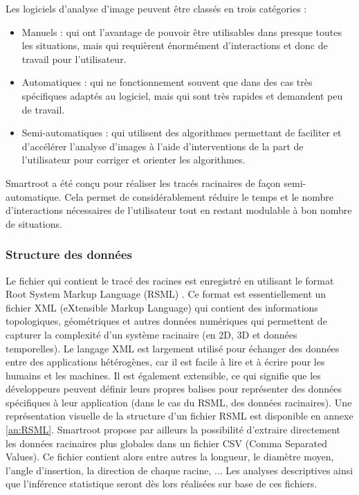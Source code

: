 \noindent Les logiciels d'analyse d'image peuvent être classés en trois catégories :
\begin{itemize}
    \item Manuels : qui ont l'avantage de pouvoir être utilisables dans presque toutes les situations, mais qui requièrent énormément d'interactions et donc de travail pour l'utilisateur.
    \item Automatiques : qui ne fonctionnement souvent que dans des cas très spécifiques adaptés au logiciel, mais qui sont très rapides et demandent peu de travail.
    \item Semi-automatiques : qui utilisent des algorithmes permettant de faciliter et d'accélérer l'analyse d'images à l'aide d'interventions de la part de l'utilisateur pour corriger et orienter les algorithmes.
\end{itemize}
Smartroot a été conçu pour réaliser les tracés racinaires de façon semi-automatique.
Cela permet de considérablement réduire le temps et le nombre d'interactions nécessaires de l'utilisateur tout en restant modulable à bon nombre de situations.

\subsubsection{Structure des données}

Le fichier qui contient le tracé des racines est enregistré en utilisant le format Root System Markup Language (RSML) \citep{lobet_plant_2014}.
Ce format est essentiellement un fichier XML (eXtensible Markup Language) qui contient des informations topologiques, géométriques et autres données numériques qui permettent de capturer la complexité d'un système racinaire (en 2D, 3D et données temporelles).
Le langage XML est largement utilisé pour échanger des données entre des applications hétérogènes, car il est facile à lire et à écrire pour les humains et les machines. 
Il est également extensible, ce qui signifie que les développeurs peuvent définir leurs propres balises pour représenter des données spécifiques à leur application (dans le cas du RSML, des données racinaires).
Une représentation visuelle de la structure d'un fichier RSML est disponible en annexe \ref{an:RSML}.
Smartroot propose par ailleurs la possibilité d'extraire directement les données racinaires plus globales dans un fichier CSV (Comma Separated Values).
Ce fichier contient alors entre autres la longueur, le diamètre moyen, l'angle d'insertion, la direction de chaque racine, ...
Les analyses descriptives ainsi que l'inférence statistique seront dès lors réalisées sur base de ces fichiers.
\newline

